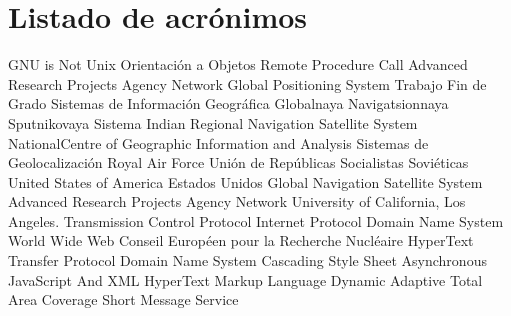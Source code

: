 \chapter{Listado de acrónimos}

{\small
\begin{acronym}[XXXXXXXX]
  		{\acs{GNU} is Not Unix}
  			{Orientación a Objetos}
  		{Remote Procedure Call}
  	{Advanced Research Projects Agency Network}
  		{Global Positioning System}
  		{Trabajo Fin de Grado}
  		{Sistemas de Información Geográfica}
  	{Globalnaya Navigatsionnaya Sputnikovaya Sistema}
  		{Indian Regional Navigation Satellite System}
  		{NationalCentre of Geographic Information and Analysis}
  			{Sistemas de Geolocalización}
  		{Royal Air Force}
  		{Unión de Repúblicas Socialistas Soviéticas}
  		{United States of America}
  		{Estados Unidos}
  		{Global Navigation Satellite System}
  	{Advanced Research Projects Agency Network}
  		{University of California, Los Angeles}.
  		{Transmission Control Protocol}
  			{Internet Protocol}
  		{Domain Name System}
  		{World Wide Web}
  		{Conseil Européen pour la Recherche Nucléaire}
  		{HyperText Transfer Protocol}
  		{Domain Name System}
  		{Cascading Style Sheet}
  		{Asynchronous JavaScript And XML}
  		{HyperText Markup Language}
  	{Dynamic Adaptive Total Area Coverage}
  		{Short Message Service}
\end{acronym}
}




